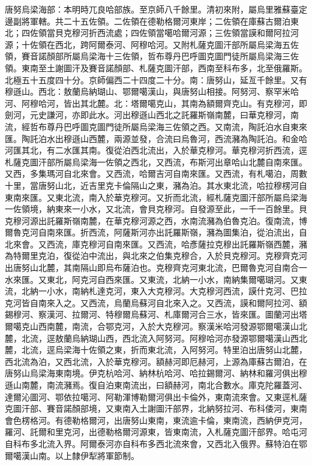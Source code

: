 \begin{pinyinscope}
唐努烏梁海部：本明時兀良哈部族。至京師八千餘里。清初來附，屬烏里雅蘇臺定邊副將軍轄。共二十五佐領。二佐領在德勒格爾河東岸；二佐領在庫蘇古爾泊東北；四佐領當貝克穆河折西流處；四佐領當噶哈爾河源；三佐領當謨和爾阿拉河源；十佐領在西北，跨阿爾泰河、阿穆哈河。又附札薩克圖汗部所屬烏梁海五佐領，賽音諾顏部所屬烏梁海十三佐領，哲布尊丹巴呼圖克圖門徒所屬烏梁海三佐領。東南至土謝圖汗及賽音諾顏部、札薩克圖汗部，西南至科布多，北至俄羅斯。北極五十五度四十分。京師偏西二十四度二十分。南：唐努山，延亙千餘里。又有穆遜山。西北：敖蘭烏納瑚山、鄂爾噶漢山，與唐努山相接。阿努河、察罕米哈河、阿穆哈河，皆出其北麓。北：塔爾噶克山，其南為額爾齊克山。有克穆河，即劍河，元史謙河，亦即此水。河出穆遜山西北之託羅斯嶺南麓，曰華克穆河，南流，經哲布尊丹巴呼圖克圖門徒所屬烏梁海三佐領之西。又南流，陶託泊水自東來匯。陶託泊水出穆遜山西麓，兩源並發，合流曰烏魯河，西流瀦為陶託泊。和金哈河匯其北，有二水匯其南。復從泊西北流出，入於華克穆河。華克穆河折西流，逕札薩克圖汗部所屬烏梁海一佐領之西北，又西流，布斯河出章哈山北麓自南來匯。又西，多集瑪河自北來會。又西流，哈爾吉河自南來匯。又西流，有札噶泊，周數十里，當唐努山北，近吉里克卡倫隔山之東，瀦為泊。其水東北流，哈拉穆楞河自東南來匯。又東北流，南入於華克穆河。又折而北流，經札薩克圖汗部所屬烏梁海一佐領境，納東來一小水，又北流，會貝克穆河。自發源至此，一千一百餘里。貝克穆河源出託羅斯嶺南麓，在華克穆河源之西，水南流瀦為伯魯克泊。復南流，博爾魯克河自南來匯。折西流，阿薩斯河亦出託羅斯嶺，瀦為圖集泊，從泊流出，自北來會。又西流，庫克穆河自南來匯。又西流，哈彥薩拉克穆出託羅斯嶺西麓，瀦為特爾里克泊，復從泊中流出，與北來之伯集克穆合，入於貝克穆河。克穆齊克河出唐努山北麓，其南隔山即烏布薩泊也。克穆齊克河東北流，巴爾魯克河自南合一水來匯。又東北，阿克河自西來匯。又東流，北納一小水，南納集爾噶瑚河。又東流，北納一小水，南納札達克河，東入大克穆河。大克穆河西流，謨什克河、巴拉克河皆自南來入之。又西流，烏蘭烏蘇河自北來入之。又西流，謨和爾阿拉河、額錫穆河、察漢河、拉爾河、特穆爾烏蘇河、札庫爾河合三水，皆來匯。圖蘭河出塔爾噶克山西南麓，南流，合鄂克河，入於大克穆河。察漢米哈河發源鄂爾噶漢山北麓，北流，逕敖蘭烏納瑚山西，西北流入阿努河。阿穆哈河亦發源鄂爾噶漢山西北麓，北流，逕烏梁海十佐領之東，折而東北流，入阿努河。特里泊出唐努山北麓，西北流為泊，又西北流，入於華克穆河。額赫河即厄赫河，上源為庫蘇古爾泊，在唐努山烏梁海東南境。伊克杭哈河、納林杭哈河、哈拉錫爾河、納林和羅河俱出穆遜山南麓，南流瀦焉。復自泊東南流出，曰額赫河，南北合數水。庫克陀羅蓋河、達爾沁圖河、鄂依拉噶河、阿勒渾博勒爾河俱出卡倫外，東南流來會。又東逕札薩克圖汗部、賽音諾顏部境，又東南入土謝圖汗部界，北納努拉河、布科倭河，東南會色楞格河。有德勒格爾河，出唐努山東南，東流逾卡倫，東南流，西納伊克河，羅河、託爾和里克河，出德勒格爾河源東，皆東南流，入札薩克圖汗部界。哈屯河自科布多北流入界。阿爾泰河亦自科布多西北流來會，又西北入俄界。蘇特泊在鄂爾噶漢山南。以上隸伊犁將軍節制。


\end{pinyinscope}